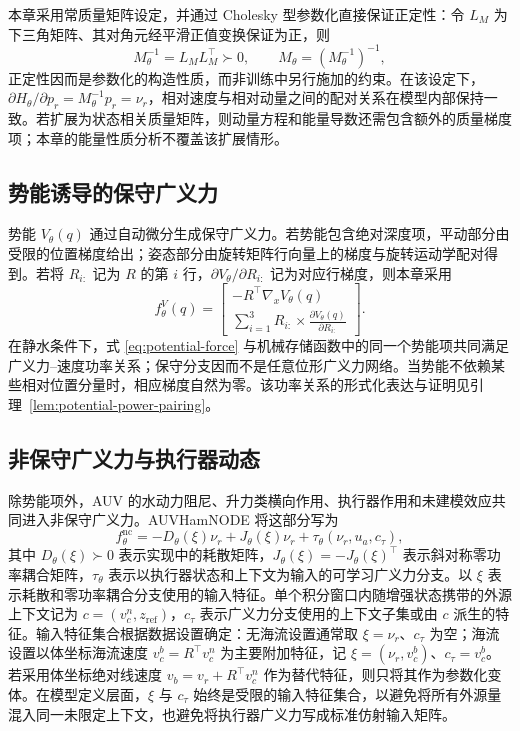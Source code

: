 \documentclass[UTF8,zihao=-4]{ctexrep}
\begin{document}
本章采用常质量矩阵设定，并通过 Cholesky 型参数化直接保证正定性：令 \(L_M\) 为下三角矩阵、其对角元经平滑正值变换保证为正，则
\begin{equation}
  M_\theta^{-1}=L_ML_M^\top\succ0,\qquad
  M_\theta=(M_\theta^{-1})^{-1},
  \label{eq:mass-parameterization}
\end{equation}
正定性因而是参数化的构造性质，而非训练中另行施加的约束。在该设定下，\(\partial H_\theta/\partial p_r=M_\theta^{-1}p_r=\nu_r\)，相对速度与相对动量之间的配对关系在模型内部保持一致。若扩展为状态相关质量矩阵，则动量方程和能量导数还需包含额外的质量梯度项；本章的能量性质分析不覆盖该扩展情形。

\subsection{势能诱导的保守广义力}

势能 \(V_\theta(q)\) 通过自动微分生成保守广义力。若势能包含绝对深度项，平动部分由受限的位置梯度给出；姿态部分由旋转矩阵行向量上的梯度与旋转运动学配对得到。若将 \(R_{i:}\) 记为 \(R\) 的第 \(i\) 行，\(\partial V_\theta/\partial R_{i:}\) 记为对应行梯度，则本章采用
\begin{equation}
  f_\theta^{V}(q)
  =
  \begin{bmatrix}
    -R^\top\nabla_x V_\theta(q)\\
    \sum_{i=1}^{3} R_{i:}\times
    \frac{\partial V_\theta(q)}{\partial R_{i:}}
  \end{bmatrix}.
  \label{eq:potential-force}
\end{equation}
在静水条件下，式 \eqref{eq:potential-force} 与机械存储函数中的同一个势能项共同满足广义力--速度功率关系；保守分支因而不是任意位形广义力网络。当势能不依赖某些相对位置分量时，相应梯度自然为零。该功率关系的形式化表达与证明见引理~\ref{lem:potential-power-pairing}。

\subsection{非保守广义力与执行器动态}

除势能项外，AUV 的水动力阻尼、升力类横向作用、执行器作用和未建模效应共同进入非保守广义力。AUVHamNODE 将这部分写为
\begin{equation}
  f_\theta^{\mathrm{nc}}
  =
  -D_\theta(\xi)\nu_r
  +J_\theta(\xi)\nu_r
  +\tau_\theta(\nu_r,u_a,c_\tau),
  \label{eq:nonconservative-force}
\end{equation}
其中 \(D_\theta(\xi)\succ0\) 表示实现中的耗散矩阵，\(J_\theta(\xi)=-J_\theta(\xi)^\top\) 表示斜对称零功率耦合矩阵，\(\tau_\theta\) 表示以执行器状态和上下文为输入的可学习广义力分支。以 \(\xi\) 表示耗散和零功率耦合分支使用的输入特征。单个积分窗口内随增强状态携带的外源上下文记为 \(c=(v_c^n,z_{\mathrm{ref}})\)，\(c_\tau\) 表示广义力分支使用的上下文子集或由 \(c\) 派生的特征。输入特征集合根据数据设置确定：无海流设置通常取 \(\xi=\nu_r\)、\(c_\tau\) 为空；海流设置以体坐标海流速度 \(v_c^b=R^\top v_c^n\) 为主要附加特征，记 \(\xi=(\nu_r,v_c^b)\)、\(c_\tau=v_c^b\)。若采用体坐标绝对线速度 \(v_b=v_r+R^\top v_c^n\) 作为替代特征，则只将其作为参数化变体。在模型定义层面，\(\xi\) 与 \(c_\tau\) 始终是受限的输入特征集合，以避免将所有外源量混入同一未限定上下文，也避免将执行器广义力写成标准仿射输入矩阵。
\end{document}
